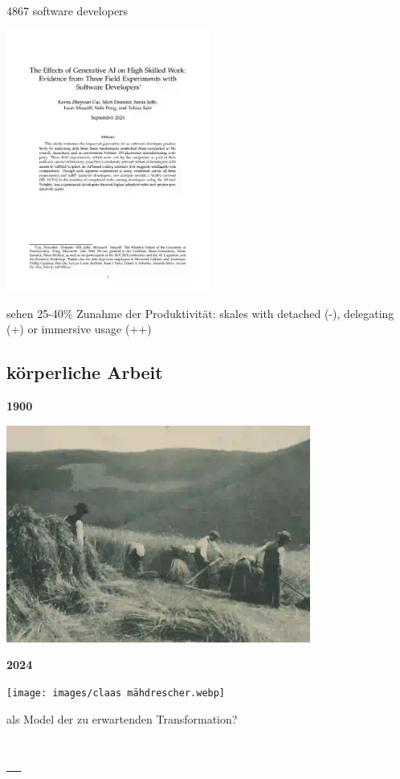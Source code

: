 \documentclass[
  letterpaper,
  DIV=11,
  numbers=noendperiod]{scrartcl}
\begin{document}
4867 software developers

\includegraphics[width=0.5\textwidth,height=\textheight]{images/High skilled work AI.webp}

sehen 25-40\% Zunahme der Produktivität: skales with detached (-),
delegating (+) or immersive usage (++)

\subsection{körperliche Arbeit}\label{kuxf6rperliche-arbeit}

\textbf{1900}

\includegraphics[width=0.75\textwidth,height=\textheight]{images/1900_landwirtschaf_1.webp}

\textbf{2024}

\texttt{[image: images/claas mähdrescher.webp]}

als Model der zu erwartenden Transformation?

\subsection{\_}\label{section-1}
\end{document}
